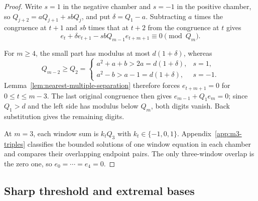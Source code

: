\begin{proof}
Write $s=1$ in the negative chamber and $s=-1$ in the positive chamber, so
$Q_{j+2}=aQ_{j+1}+sbQ_j$, and put $\delta=Q_1-a$.  Subtracting $a$ times
the congruence at $t+1$ and $sb$ times that at $t+2$ from the congruence at
$t$ gives
\begin{equation}
e_t+\delta e_{t+1}-sbQ_{m-1}e_{t+m+1}\equiv0\pmod{Q_m}.
\label{eq:quadratic-elimination}
\end{equation}

For $m\ge4$, the small part has modulus at most $d(1+\delta)$, whereas
\[
Q_{m-2}\ge Q_2=
\begin{cases}
a^2+a+b>2a=d(1+\delta),&s=1,\\
a^2-b>a-1=d(1+\delta),&s=-1.
\end{cases}
\]
Lemma~\ref{lem:nearest-multiple-separation} therefore forces
$e_{t+m+1}=0$ for $0\le t\le m-3$.  The last original congruence then gives
$e_{m-1}+Q_1e_m=0$; since $Q_1>d$ and the left side has modulus below
$Q_m$, both digits vanish.  Back substitution gives the remaining digits.

At $m=3$, each window sum is $k_tQ_3$ with
$k_t\in\{-1,0,1\}$.  Appendix~\ref{app:m3-triples} classifies the bounded
solutions of one window equation in each chamber and compares their
overlapping endpoint pairs.  The only three-window overlap is the zero one,
so $e_0=\cdots=e_4=0$.
\end{proof}

\subsection{Sharp threshold and extremal bases}

